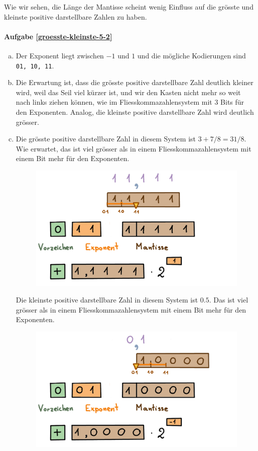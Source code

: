 Wie wir sehen, die Länge der Mantisse scheint wenig Einfluss auf die grösste und kleinste positive darstellbare Zahlen zu haben.

\paragraph{Aufgabe \ref{groesste-kleinste-5-2}}
\begin{enumerate}[(a)]
\item Der Exponent liegt zwischen \(-1\) und \(1\) und die mögliche Kodierungen sind \texttt{01, 10, 11}.
\item Die Erwartung ist, dass die grösste positive darstellbare Zahl deutlich kleiner wird, weil das Seil viel kürzer ist, und wir den Kasten nicht mehr so weit nach links ziehen können, wie im Fliesskommazahlensystem mit \(3\) Bits für den Exponenten. Analog, die kleinste positive darstellbare Zahl wird deutlich grösser.
\item Die grösste positive darstellbare Zahl in diesem System ist \(3+7/8 = 31/8\). Wie erwartet, das ist viel grösser als in einem Fliesskommazahlensystem mit einem Bit mehr für den Exponenten.
\begin{figure}[H]
\centering
\includegraphics[width=0.85\linewidth]{Pictures/groessteZahl-5-2.png}
\end{figure}

Die kleinste positive darstellbare Zahl in diesem System ist \(0.5\). Das ist viel grösser als in einem Fliesskommazahlensystem mit einem Bit mehr für den Exponenten.
\begin{figure}[H]
\centering
\includegraphics[width=0.85\linewidth]{Pictures/kleinsteZahl-5-2.png}
\end{figure}

\end{enumerate}


